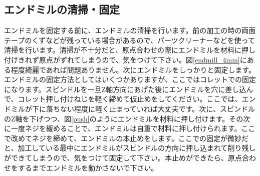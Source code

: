 \documentclass[b5paper, 9pt, twocolumn, titlepage,openany]{jsbook}%
\begin{document}
\subsection{エンドミルの清掃・固定}
エンドミルを固定する前に、エンドミルの清掃を行います。前の加工の時の両面テープのくずなどが残っている場合があるので、パーツクリーナーなどを使って清掃を行います。清掃が不十分だと、原点合わせの際にエンドミルを材料に押し付けきれず原点がずれてしまうので、気をつけて下さい。図\ref{endmill_4mm}にある程度綺麗であれば問題ありません。次にエンドミルをしっかりと固定します。エンドミルの固定方法としてはいくつかありますが、ここではコレットでの固定になります。スピンドルを一旦Z軸方向にあげた後にエンドミルを穴に差し込んで、コレット押し付けねじを軽く締めて仮止めをしてください。ここでは、エンドミルが下に落ちない程度に軽く止まっていれば大丈夫です。次に、スピンドルのZ軸を下げつつ、図\ref{push}のようにエンドミルを材料に押し付けます。その次に一度ネジを緩めることで、エンドミルは自重で材料に押し付けられます。ここで改めてネジを締めて、エンドミルの本止めをします。ここでの固定が微妙だと、加工している最中にエンドミルがスピンドルの方向に押し込まれて削り残しができてしまうので、気をつけて固定して下さい。本止めができたら、原点合わせをするまでエンドミルを動かさないで下さい。\\
\end{document}
